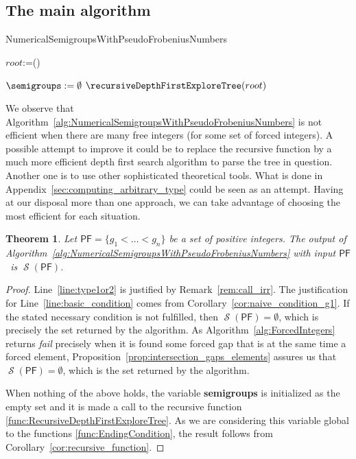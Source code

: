 \documentclass[11pt]{amsart}
\newtheorem{theorem}{Theorem}
\theoremstyle{remark}
\begin{document}
\subsection{The main algorithm}
\label{subsec:the_main_algorithm}
\begin{algorithm}[ht]\caption{NumericalSemigroupsWithPseudoFrobeniusNumbers\label{alg:NumericalSemigroupsWithPseudoFrobeniusNumbers}}
\Input{\PF}
\BlankLine
\nl\label{line:type1or2} 
\nl\label{line:basic_condition} 
\If{$\Not\ (\PF[\type] - \PF[\type-1] > \PF[1])$}{\Return $\emptyset$;}

\nl\label{line:forced_fail} 
$root$:=\ForcedIntegers(\PF)\;

$\semigroups:=\emptyset$\;
$\recursiveDepthFirstExploreTree(root)$\;
\Return \semigroups\;
\end{algorithm}

We observe that Algorithm~\ref{alg:NumericalSemigroupsWithPseudoFrobeniusNumbers} is not efficient when there are many free integers (for some set of forced integers). A possible attempt to improve it could be to replace the recursive function by a much more efficient depth first search algorithm to parse the tree in question. Another one is to use other sophisticated theoretical tools. What is done in Appendix~\ref{sec:computing_arbitrary_type} could be seen as an attempt. Having at our disposal more than one approach, we can take advantage of choosing the most efficient for each situation. 
\begin{theorem}\label{th:correction_of_algorithm}
Let ${\ensuremath{\mathsf{PF}}}=\{g_1<\dots<g_n\}$ be a set of positive integers.
The output of Algorithm~\ref{alg:NumericalSemigroupsWithPseudoFrobeniusNumbers} with input {\ensuremath{\mathsf{PF}}}\ is $\operatorname{\mathcal{S}}({\ensuremath{\mathsf{PF}}})$.
\end{theorem}
\begin{proof}
Line~\ref{line:type1or2} is justified by Remark~\ref{rem:call_irr}. 
The justification for Line~\ref{line:basic_condition} comes from Corollary~\ref{cor:naive_condition_g1}. If the stated necessary condition is not fulfilled, then $\operatorname{\mathcal{S}}({\ensuremath{\mathsf{PF}}})=\emptyset$, which is precisely the set returned by the algorithm. 
As Algorithm~\ref{alg:ForcedIntegers} returns \emph{fail} precisely when it is found some forced gap that is at the same time a forced element, Proposition~\ref{prop:intersection_gaps_elements} assures us that $\operatorname{\mathcal{S}}({\ensuremath{\mathsf{PF}}})=\emptyset$, which is the set returned by the algorithm.

When nothing of the above holds, the variable \textbf{semigroups} is initialized as the empty set and it is made a call to the recursive function \ref{func:RecursiveDepthFirstExploreTree}. As we are considering this variable global to the functions \ref{func:EndingCondition},
the result follows from Corollary~\ref{cor:recursive_function}.
\end{proof}
\end{document}
